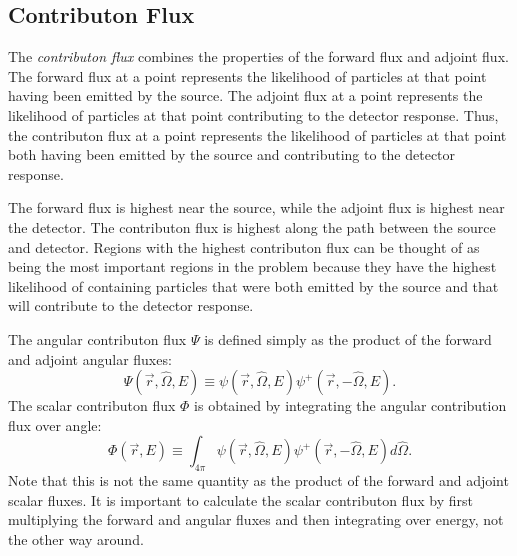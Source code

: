 \subsection{Contributon Flux}
\label{sec:bg:rt:contrib}

The \textit{contributon flux} combines the properties of the forward flux and adjoint flux.
The forward flux at a point represents the likelihood of particles at that point having been emitted by the source.
The adjoint flux at a point represents the likelihood of particles at that point contributing to the detector response.
Thus, the contributon flux at a point represents the likelihood of particles at that point both having been emitted by the source and contributing to the detector response.

The forward flux is highest near the source, while the adjoint flux is highest near the detector.
The contributon flux is highest along the path between the source and detector.
Regions with the highest contributon flux can be thought of as being the most important regions in the problem because they have the highest likelihood of containing particles that were both emitted by the source and that will contribute to the detector response.

The angular contributon flux $\Psi$ is defined simply as the product of the forward and adjoint angular fluxes:
\begin{equation}\label{eq:bg:rt:angular-contributon}
  \Psi\left(\vec{r},\hat{\Omega},E\right) \equiv
  \psi\left(\vec{r},\hat{\Omega},E\right)\psi^+\left(\vec{r},-\hat{\Omega},E\right).
\end{equation}
The scalar contributon flux $\Phi$ is obtained by integrating the angular contribution flux over angle:
\begin{equation}\label{eq:bg:rt:angular-contributon}
  \Phi\left(\vec{r},E\right) \equiv
  \int_{4\pi}\psi\left(\vec{r},\hat{\Omega},E\right)\psi^+\left(\vec{r},-\hat{\Omega},E\right)d\hat{\Omega}.
\end{equation}
Note that this is not the same quantity as the product of the forward and adjoint scalar fluxes.
It is important to calculate the scalar contributon flux by first multiplying the forward and angular fluxes and then integrating over energy, not the other way around.

